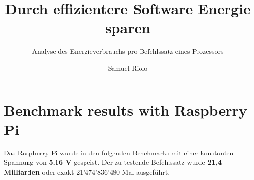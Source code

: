 \documentclass{../template/ffhsthesis}
\begin{document}


\title{Durch effizientere Software Energie sparen}
\subtitle{Analyse des Energieverbrauchs pro Befehlssatz eines Prozessors} %
\author{Samuel Riolo}


\maketitle



\startThesis
\chapter{Benchmark results with Raspberry Pi}
Das Raspberry Pi wurde in den folgenden Benchmarks mit einer konstanten Spannung von \textbf{5.16 V} gespeist. Der zu testende Befehlssatz wurde \textbf{21,4 Milliarden} oder exakt 21'474'836'480 Mal ausgeführt.

\tikzset{every picture/.style=thick}
\end{document}
